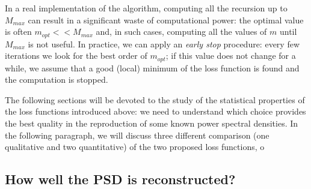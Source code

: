 \documentclass{aa}
\begin{document}
In a real implementation of the algorithm, computing all the recursion up to $M_{max}$ can result in a significant waste of computational power: the optimal value is often $m_{opt} << M_{max}$ and, in such cases, computing all the values of $m$ until $M_{max}$ is not useful.
In practice, we can apply an \textit{early stop} procedure: every few iterations we look for the best order of $m_{opt}$; if this value does not change for a while, we assume that a good (local) minimum of the loss function is found and the computation is stopped.

The following sections will be devoted to the study of the statistical properties of the loss functions introduced above: we need to understand which choice provides the best quality in the reproduction of some known power spectral densities. In the following paragraph, we will discuss three different comparison (one qualitative and two quantitative) of the two proposed loss functions, o 
\subsection{How well the PSD is reconstructed?}\label{sec:psd_validation}
\end{document}
